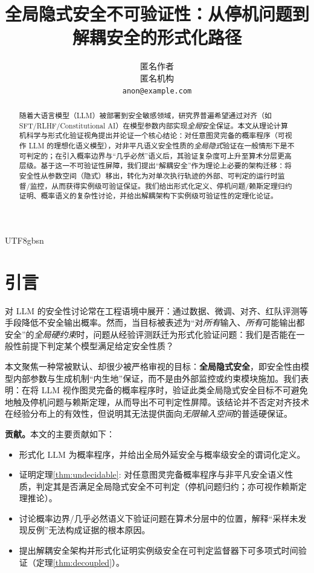 \documentclass[letterpaper,twocolumn,10pt]{article}
\begin{document}
\begin{CJK}{UTF8}{gbsn}

\title{全局隐式安全不可验证性：从停机问题到解耦安全的形式化路径}

\author{%
匿名作者\\
匿名机构\\
\texttt{anon@example.com}%
}

\maketitle

\begin{abstract}
随着大语言模型（LLM）被部署到安全敏感领域，研究界普遍希望通过对齐（如 SFT/RLHF/Constitutional AI）在模型参数内部实现\emph{全局}安全保证。本文从理论计算机科学与形式化验证视角提出并论证一个核心结论：对任意图灵完备的概率程序（可视作 LLM 的理想化语义模型），对非平凡语义安全性质的\emph{全局隐式}验证在一般情形下是不可判定的；在引入概率边界与“几乎必然”语义后，其验证复杂度可上升至算术分层更高层级。基于这一不可验证性屏障，我们提出“解耦安全”作为理论上必要的架构迁移：将安全性从参数空间（隐式）移出，转化为对单次执行轨迹的外部、可判定的运行时监督/监控，从而获得实例级可验证保证。我们给出形式化定义、停机问题/赖斯定理归约证明、概率语义的复杂性讨论，并给出解耦架构下实例级可验证性的定理化论证。
\end{abstract}

\section{引言}
对 LLM 的安全性讨论常在工程语境中展开：通过数据、微调、对齐、红队评测等手段降低不安全输出概率。然而，当目标被表述为“对\emph{所有}输入、\emph{所有}可能输出都安全”的\emph{全局硬约束}时，问题从经验评测跃迁为形式化验证问题：我们是否能在一般性前提下判定某个模型满足给定安全性质？

本文聚焦一种常被默认、却很少被严格审视的目标：\textbf{全局隐式安全}，即安全性由模型内部参数与生成机制“内生地”保证，而不是由外部监控或约束模块施加。我们表明：在将 LLM 视作图灵完备的概率程序时，验证此类全局隐式安全目标不可避免地触及停机问题与赖斯定理，从而导出不可判定性屏障。该结论并不否定对齐技术在经验分布上的有效性，但说明其无法提供面向\emph{无限输入空间}的普适硬保证。

\textbf{贡献。}本文的主要贡献如下：
\begin{itemize}[leftmargin=*,itemsep=0.2em]
  \item 形式化 LLM 为概率程序，并给出全局外延安全与概率级安全的谓词化定义。
  \item 证明定理\ref{thm:undecidable}: 对任意图灵完备概率程序与非平凡安全语义性质，判定其是否满足全局隐式安全不可判定（停机问题归约；亦可视作赖斯定理推论）。
  \item 讨论概率边界/几乎必然语义下验证问题在算术分层中的位置，解释“采样未发现反例”无法构成证据的根本原因。
  \item 提出解耦安全架构并形式化证明实例级安全在可判定监督器下可多项式时间验证（定理\ref{thm:decoupled}）。
\end{itemize}


\end{CJK}
\end{document}
